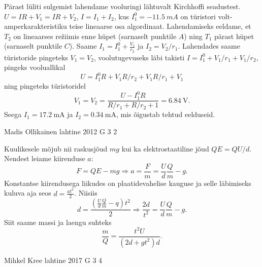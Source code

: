 \documentclass[11pt, twoside]{article}
\begin{document}
{{\begin{figure}[h]
\begin{center}
\end{center}
\end{figure}
Pärast lüliti sulgemist lahendame vooluringi lähtuvalt Kirchhoffi seadustest. $U = IR + V_1 = IR + V_2$, $I = I_1 + I_2$, kus $I_1^0=\SI{-11.5}{mA}$ on türistori volt-amperkarakteristiku teise lineaarse osa algordinaat.
Lahendamiseks eeldame, et $T_2$ on lineaarses režiimis enne hüpet (sarnaselt punktile $A$) ning $T_1$ pärast hüpet (sarnaselt punktile $C$). Saame $I_1 = I_1^0 + \frac{V_1}{r_2}$ ja $I_2 = V_2/r_1$. Lahendades saame türistoride pingeteks $V_1 = V_2$, voolutugevuseks läbi takisti $I = I_1^0 + V_1/r_1 + V_1/r_2$, pingeks vooluallikal
\[
U = I_1^0R + V_1R/r_2 + V_1R/r_1 + V_1
\]
ning pingeteks türistoridel
\[
V_1 = V_2 = \frac{U - I_1^0R}{R/r_1 + R/r_2 + 1} = \SI{6.84}{\volt}.
\]
Seega $I_1 = \SI{17.2}{\milli\ampere}$ ja $I_2 = \SI{0.34}{\milli\ampere}$, mis õigustab tehtud eelduseid. 
\fi
}

{Madis Ollikainen} %
{lahtine} %
{2012} %
{G 3} %
{2} %
{

\ifSolution
Kuulikesele mõjub nii raskusjõud $mg$ kui ka elektrostaatiline jõud $QE=QU/d$. Nendest leiame kiirenduse $a$:
\[ F = QE - mg \Rightarrow a = \frac{F}{m} = \frac{U}{d}\frac{Q}{m} - g. \]
Konstantse kiirendusega liikudes on plaatidevahelise kauguse ja selle läbimiseks kuluva aja seos $ d = \frac{at^2}{2} $. Niisiis
\[ d = \frac{\left(\frac{U}{d}\frac{Q}{m} - q\right)t^2}{2} \Rightarrow \frac{2d}{t^2} = \frac{U}{d}\frac{Q}{m} - g. \]
Siit saame massi ja laengu suhteks
\[ \frac{m}{Q} = \frac{t^2U}{\left(2d + gt^2\right)d}. \]
\fi
}

{Mihkel Kree} %
{lahtine} %
{2017} %
{G 3} %
{4} %
{

}}
\end{document}

